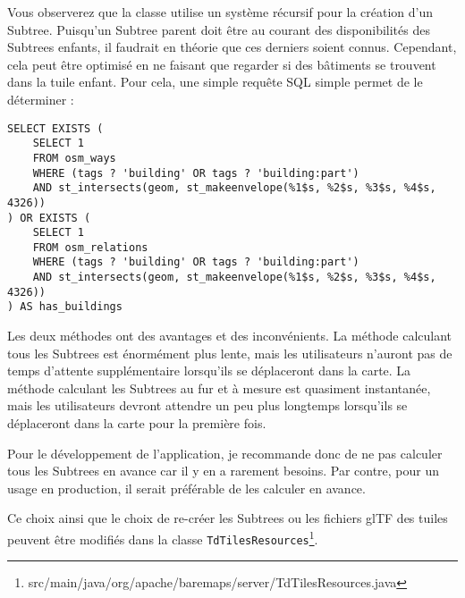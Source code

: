 Vous observerez que la classe utilise un système récursif pour la création d'un Subtree. Puisqu'un Subtree parent doit être au courant des disponibilités des Subtrees enfants, il faudrait en théorie que ces derniers soient connus. Cependant, cela peut être optimisé en ne faisant que regarder si des bâtiments se trouvent dans la tuile enfant. Pour cela, une simple requête SQL simple permet de le déterminer :

\begin{verbatim}
SELECT EXISTS (
    SELECT 1
    FROM osm_ways
    WHERE (tags ? 'building' OR tags ? 'building:part')
    AND st_intersects(geom, st_makeenvelope(%1$s, %2$s, %3$s, %4$s, 4326))
) OR EXISTS (
    SELECT 1
    FROM osm_relations
    WHERE (tags ? 'building' OR tags ? 'building:part')
    AND st_intersects(geom, st_makeenvelope(%1$s, %2$s, %3$s, %4$s, 4326))
) AS has_buildings
\end{verbatim}

Les deux méthodes ont des avantages et des inconvénients. La méthode calculant tous les Subtrees est énormément plus lente, mais les utilisateurs n'auront pas de temps d'attente supplémentaire lorsqu'ils se déplaceront dans la carte. La méthode calculant les Subtrees au fur et à mesure est quasiment instantanée, mais les utilisateurs devront attendre un peu plus longtemps lorsqu'ils se déplaceront dans la carte pour la première fois.

Pour le développement de l'application, je recommande donc de ne pas calculer tous les Subtrees en avance car il y en a rarement besoins. Par contre, pour un usage en production, il serait préférable de les calculer en avance.

Ce choix ainsi que le choix de re-créer les Subtrees ou les fichiers glTF des tuiles peuvent être modifiés dans la classe \texttt{TdTilesResources}\footnote{src/main/java/org/apache/baremaps/server/TdTilesResources.java}.
